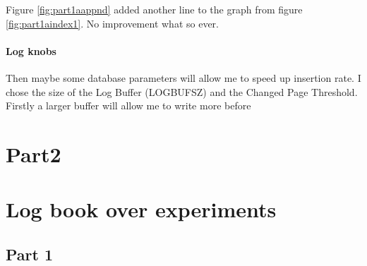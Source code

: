 Figure \ref{fig:part1aappnd} added another line to the graph from figure
\ref{fig:part1aindex1}. No improvement what so ever.

\subsubsection{Log knobs}
Then maybe some database parameters will allow me to speed up insertion rate. I
chose the size of the Log Buffer (LOGBUFSZ) and the Changed Page Threshold.
Firstly a larger buffer will allow me to write more before 


\chapter{Part2}


\chapter{Log book over experiments}

\section{Part 1}

